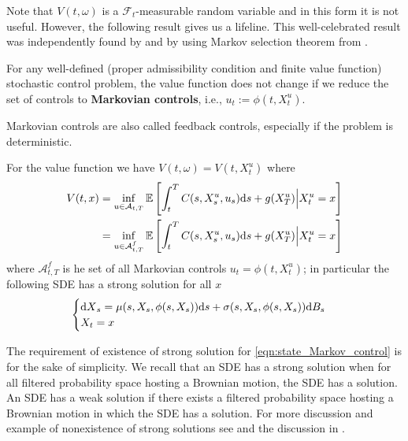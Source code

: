 \documentclass[11pt]{book}
\newcommand{\dd}{\text{\normalfont d}}
\newcommand{\ds}{\text{\normalfont d}s}
\newcommand{\dX}{\text{\normalfont d}X}
\begin{document}
Note that $V(t,\omega)$ is a $\mathcal{F}_t$-measurable random variable and in this form it is not useful. However, the following result gives us a lifeline. This well-celebrated result was independently found by \cite{haussmann1986existence} and \cite{el1987compactification} by using Markov selection theorem from \cite{Krylov1973selection}.
\begin{thm}
    For any well-defined (proper admissibility condition and finite value function) stochastic control problem, the value function does not change if we reduce the set of controls to \textbf{Markovian controls}, i.e., $u_t:=\phi(t,X_t^u)$. 
\end{thm}
Markovian controls are also called feedback controls, especially if the problem is deterministic. 
\begin{coro}\label{coro:Markov_value_function}
    For the value function we have $V(t,\omega)= V(t,X_t^u)$ where
\begin{equation}\label{eqn:value_function_omega}
\begin{split}
    V(t,x)&=\inf_{u\in\mathcal{A}_{t,T}}\mathbb{E}\left[\int_{t}^{T}C(s,X_s^u,u_s){{\ds}}+g(X_T^u)\Big|X^u_t=x\right]\\
    &= \inf_{u\in\mathcal{A}^f_{t,T}}\mathbb{E}\left[\int_{t}^{T}C(s,X_s^u,u_s){{\ds}}+g(X_T^u)\Big|X^u_t=x\right]
\end{split}
\end{equation}
where $\mathcal{A}^f_{t,T}$ is he set of all Markovian controls $u_t=\phi(t,X^u_t)$; in particular the following SDE has a strong solution for all $x$
\begin{equation}\label{eqn:state_Markov_control}
	\begin{cases}
		{\dX}_s =\mu(s,X_s,\phi(s,X_s)){{\ds}}+\sigma(s,X_s,\phi(s,X_s)){\dd}B_s\\
		X_t=x
	\end{cases}
\end{equation}
\end{coro}
\begin{rem}
    The requirement of existence of strong solution for \eqref{eqn:state_Markov_control} is for the sake of simplicity. We recall that an SDE has a strong solution when for all filtered probability space hosting a Brownian motion, the SDE has a solution. An SDE has a weak solution if there exists a filtered probability space hosting a Brownian motion in which the SDE has a solution. For more discussion and example of nonexistence of strong solutions see \cite{tsirel1976example} and the discussion in \cite{rogers2000diffusions}.
\end{rem}
\end{document}

